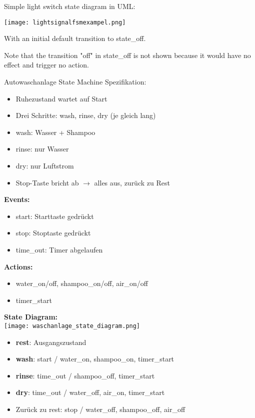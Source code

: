 \begin{example}
Simple light switch state diagram in UML:

\texttt{[image: lightsignalfsmexampel.png]}

With an initial default transition to state\_off.

Note that the transition "off" in state\_off is not shown because it would have no effect and trigger no action.
\end{example}

\begin{example2}{Autowaschanlage State Machine}
    Spezifikation:
    \begin{itemize}
        \item Ruhezustand wartet auf Start
        \item Drei Schritte: wash, rinse, dry (je gleich lang)
        \item wash: Wasser + Shampoo
        \item rinse: nur Wasser  
        \item dry: nur Luftstrom
        \item Stop-Taste bricht ab $\rightarrow$ alles aus, zurück zu Rest
    \end{itemize}
    
    \tcblower
    
    \textbf{Events:}
    \begin{itemize}
        \item start: Starttaste gedrückt
        \item stop: Stoptaste gedrückt
        \item time\_out: Timer abgelaufen
    \end{itemize}
    
    \textbf{Actions:}
    \begin{itemize}
        \item water\_on/off, shampoo\_on/off, air\_on/off
        \item timer\_start
    \end{itemize}
    
    \textbf{State Diagram:}\\
    \texttt{[image: waschanlage\_state\_diagram.png]}
    \begin{itemize}
        \item \textbf{rest}: Ausgangszustand
        \item \textbf{wash}: start / water\_on, shampoo\_on, timer\_start
        \item \textbf{rinse}: time\_out / shampoo\_off, timer\_start
        \item \textbf{dry}: time\_out / water\_off, air\_on, timer\_start
        \item Zurück zu rest: stop / water\_off, shampoo\_off, air\_off
    \end{itemize}
\end{example2}



